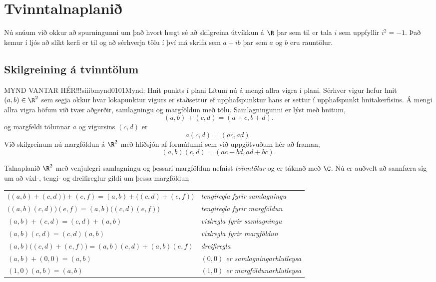 \section{Tvinntalnaplanið}

Nú snúum við okkur að spurningunni um það  hvort hægt sé að skilgreina
útvíkkun  á $\R$ þar sem til er tala $i$ sem uppfyllir $i^2=-1$.
Það kemur í ljós að slíkt kerfi er til og að sérhverja tölu í því má
skrifa sem $a+ib$ þar sem $a$ og $b$ eru rauntölur.


\subsection*{Skilgreining á tvinntölum}


MYND VANTAR HÉR!!!{siiibmynd0101}{{\small Mynd: Hnit punkts í plani}}  
Lítum nú á mengi allra vigra í plani.  Sérhver vigur hefur hnit
$(a,b)\in \R^2$ sem segja okkur hvar lokapunktur vigurs er staðsettur ef
upphafspunktur hans er settur í upphafspunkt hnitakerfisins.
Á mengi allra vigra höfum við tvær aðgerðir, samlagningu og margföldun
með tölu.  Samlagningunni er lýst með hnitum, 
$$(a,b)+(c,d)=(a+c,b+d).
$$  
og margfeldi tölunnar $a$ og vigursins $(c,d)$ er
$$
a(c,d)=(ac,ad).
$$ 
Við skilgreinum nú margföldun á $\R^2$ með hliðsjón af formúlunni sem við
uppgötvuðum hér að framan, 
$$
(a,b)(c,d)=(ac-bd,ad+bc).
$$


Talnaplanið $\R^2$ með venjulegri samlagningu og þessari margföldun
nefnist {\it tvinntölur } og er táknað með $\C$.  Nú er auðvelt að
sannfæra  sig um að víxl-, tengi- og dreifireglur gildi um
þessa margföldun
\begin{center}
\begin{tabular}{ll}
$\big((a,b)+(c,d)\big)+(e,f)=(a,b)+\big((c,d)+(e,f)\big)$
&{\it tengiregla fyrir samlagningu}\\
$\big((a,b)(c,d)\big)(e,f)=(a,b)\big((c,d)(e,f)\big)$
&{\it tengiregla fyrir margföldun}\\
$(a,b)+(c,d)=(c,d)+(a,b)$ 
&{\it víxlregla fyrir samlagningu} \\
$(a,b)(c,d)=(c,d)(a,b)$ 
&{\it víxlregla fyrir margföldun} \\
$(a,b)\big((c,d)+(e,f)\big) =(a,b)(c,d)+(a,b)(e,f)$
&{\it dreifiregla}\\
$(a,b)+(0,0)=(a,b)$
&{\it $(0,0)$ er samlagningarhlutleysa}\\
$(1,0)(a,b)=(a,b)$
&{\it $(1,0)$ er margföldunarhlutleysa}\\
\end{tabular}
\end{center}


